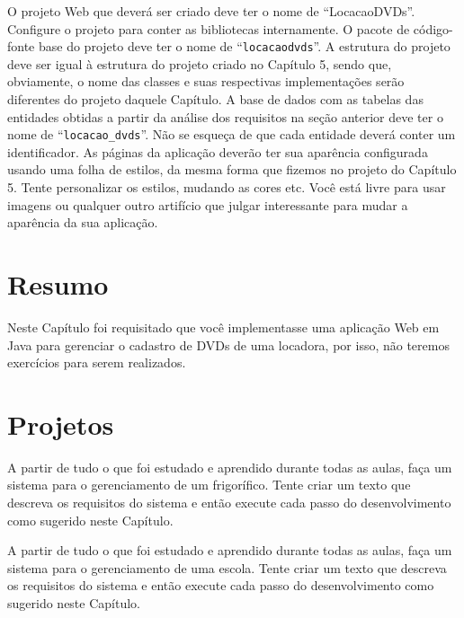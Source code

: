 O projeto Web que deverá ser criado deve ter o nome de ``LocacaoDVDs''. Configure o projeto para conter as bibliotecas internamente. O pacote de código-fonte base do projeto deve ter o nome de ``\texttt{locacaodvds}''. A estrutura do projeto deve ser igual à estrutura do projeto criado no Capítulo 5, sendo que, obviamente, o nome das classes e suas respectivas implementações serão diferentes do projeto daquele Capítulo. A base de dados com as tabelas das entidades obtidas a partir da análise dos requisitos na seção anterior deve ter o nome de ``\texttt{locacao\_dvds}''. Não se esqueça de que cada entidade deverá conter um identificador. As páginas da aplicação deverão ter sua aparência configurada usando uma folha de estilos, da mesma forma que fizemos no projeto do Capítulo 5. Tente personalizar os estilos, mudando as cores etc. Você está livre para usar imagens ou qualquer outro artifício que julgar interessante para mudar a aparência da sua aplicação.


\section{Resumo}

Neste Capítulo foi requisitado que você implementasse uma aplicação Web em Java para gerenciar o cadastro de DVDs de uma locadora, por isso, não teremos exercícios para serem realizados. 


\section{Projetos}

\begin{projetoSemArquivo}{}{}{}
    A partir de tudo o que foi estudado e aprendido durante todas as aulas, faça um sistema para o gerenciamento de um frigorífico. Tente criar um texto que descreva os requisitos do sistema e então execute cada passo do desenvolvimento como sugerido neste Capítulo.
\end{projetoSemArquivo}

\begin{projetoSemArquivo}{}{}{}
     A partir de tudo o que foi estudado e aprendido durante todas as aulas, faça um sistema para o gerenciamento de uma escola. Tente criar um texto que descreva os requisitos do sistema e então execute cada passo do desenvolvimento como sugerido neste Capítulo.
\end{projetoSemArquivo}
